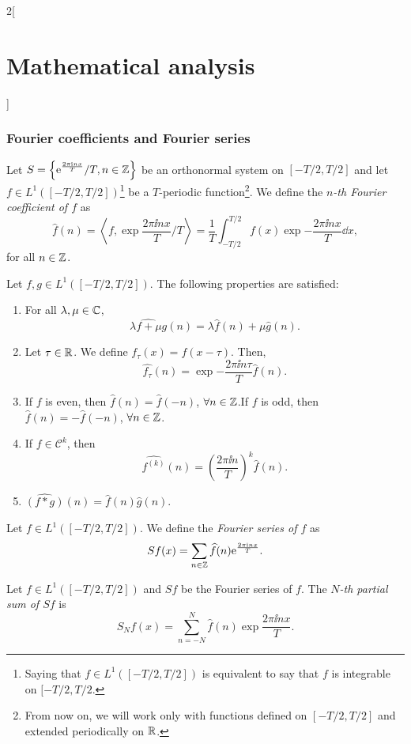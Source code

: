 \documentclass[../../../main.tex]{subfiles}
\begin{document}
\begin{multicols}{2}[\section{Mathematical analysis}]
\subsubsection*{Fourier coefficients and Fourier series}
\begin{definition}
Let $\displaystyle S=\left\{\mathrm{e}^{\frac{2\pi\mathrm{i} nx}{T}}/T,n\in\mathbb{Z} \right\}$ be an or\-tho\-nor\-mal system on $[-T/2,T/2]$ and let $f\in L^1([-T/2,T/2])$\footnote{Saying that $f\in L^1([-T/2,T/2])$ is equivalent to say that $f$ is integrable on $[-T/2,T/2$.} be a $T$-periodic function\footnote{From now on, we will work only with functions defined on $[-T/2,T/2]$ and extended periodically on $\mathbb{R} $.}. We define the \textit{$n$-th Fourier coefficient of $f$} as $$\widehat{f}(n)=\left\langle f,\exp{\frac{2\pi\ii nx}{T}}/T\right\rangle=\frac{1}{T}\int_{-T/2}^{T/2}f(x)\exp{-\frac{2\pi\ii nx}{T}}\dd x,$$ for all $n\in\mathbb{Z} $.
\end{definition}
\begin{prop}
Let $f,g\in L^1([-T/2,T/2])$. The following properties are satisfied:
\begin{enumerate}
    \item For all $\lambda,\mu\in\mathbb{C} $, $$\widehat{\lambda f+\mu g}(n)=\lambda\widehat{f}(n)+\mu\widehat{g}(n).$$
    \item Let $\tau\in\mathbb{R} $. We define $f_\tau(x)=f(x-\tau)$. Then, $$\widehat{f_\tau}(n)=\exp{-\frac{2\pi\ii n\tau}{T}}\widehat{f}(n).$$
    \item If $f$ is even, then $\widehat{f}(n)=\widehat{f}(-n)$, $\forall n\in\mathbb{Z} $.\newline If $f$ is odd, then $\widehat{f}(n)=-\widehat{f}(-n)$, $\forall n\in\mathbb{Z} $. 
    \item If $f\in \mathcal{C}^k$, then $$\widehat{f^{(k)}}(n)=\left(\frac{2\pi\ii n}{T}\right)^k\widehat{f}(n).$$
    \item $\widehat{(f*g)}(n)=\widehat{f}(n)\widehat{g}(n)$.
\end{enumerate}
\end{prop}
\begin{definition}
Let $f\in L^1([-T/2,T/2])$. We define the \textit{Fourier series of $f$} as $$\displaystyle Sf(x)=\sum_{n\in\mathbb{Z} }\widehat{f}(n)\mathrm{e}^{\frac{2\pi\mathrm{i} nx}{T}}.$$
\end{definition}
\begin{definition}
Let $f\in L^1([-T/2,T/2])$ and $Sf$ be the Fourier series of $f$. The \textit{$N$-th partial sum of $Sf$} is $$S_Nf(x)=\sum_{n=-N}^N\widehat{f}(n)\exp{\frac{2\pi\ii nx}{T}}.$$
\end{definition}

\end{multicols}
\end{document}
